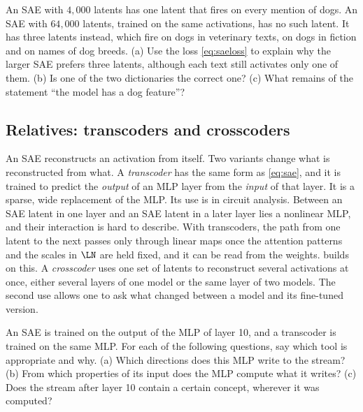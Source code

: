 \begin{exercise}\label{ex:splitting}
An SAE with $4{,}000$ latents has one latent that fires on every mention of dogs. An SAE with $64{,}000$ latents,
trained on the same activations, has no such latent. It has three latents instead, which fire on dogs in
veterinary texts, on dogs in fiction and on names of dog breeds. (a) Use the loss \eqref{eq:saeloss} to explain
why the larger SAE prefers three latents, although each text still activates only one of them. (b) Is one of the
two dictionaries the correct one? (c) What remains of the statement ``the model has a dog feature''?
\end{exercise}

\subsection{Relatives: transcoders and crosscoders}
\label{sec:transcoders}

An SAE reconstructs an activation from itself. Two variants change what is reconstructed from what.
A \emph{transcoder} \citep{dunefsky2024transcoders} has the same form as \eqref{eq:sae}, and it is trained to
predict the \emph{output} of an MLP layer from the \emph{input} of that layer. It is a sparse, wide replacement
of the MLP. Its use is in circuit analysis. Between an SAE latent in one layer and an SAE latent in a later
layer lies a nonlinear MLP, and their interaction is hard to describe. With transcoders, the path from one
latent to the next passes only through linear maps once the attention patterns and the scales in $\LN$ are
held fixed, and it can be read from the weights.  builds on this. A \emph{crosscoder} \citep{lindsey2024crosscoders}
uses one set of latents to reconstruct several activations at once, either several layers of one model or the
same layer of two models. The second use allows one to ask what changed between a model and its fine-tuned
version.

\begin{exercise}\label{ex:transcoder}
An SAE is trained on the output of the MLP of layer 10, and a transcoder is trained on the same MLP. For each of
the following questions, say which tool is appropriate and why. (a) Which directions does this MLP write to the
stream? (b) From which properties of its input does the MLP compute what it writes? (c) Does the stream after
layer 10 contain a certain concept, wherever it was computed?
\end{exercise}

